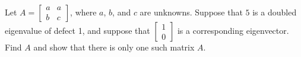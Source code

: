 \begin{exercise}\ansMark%
Let $A =
\left[ \begin{smallmatrix}
a & a \\
b & c
\end{smallmatrix}\right]$, where $a$, $b$, and $c$ are unknowns.
Suppose that $5$ is a doubled eigenvalue of defect 1, and suppose that
$\left[ \begin{smallmatrix}
1 \\ 0
\end{smallmatrix}\right]$ is a corresponding eigenvector.  Find $A$ and show that
there is only one such matrix $A$.
\end{exercise}

